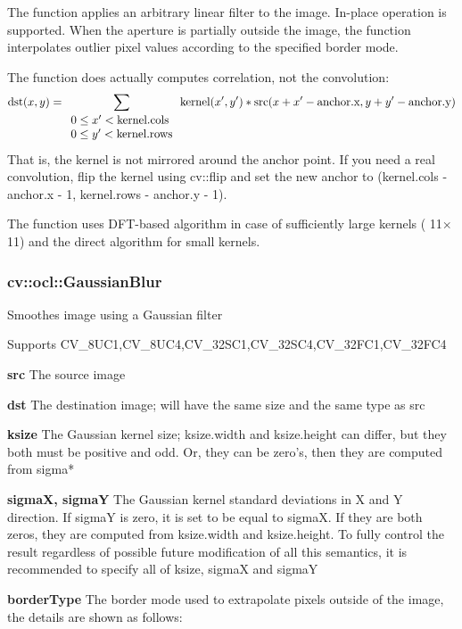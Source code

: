 \documentclass{article}
\begin{document}
The function applies an arbitrary linear filter to the image. In-place
operation is supported. When the aperture is partially outside the image,
the function interpolates outlier pixel values according to the specified
border mode.

The function does actually computes correlation, not the convolution:
\[
\mbox{dst}(x,y)=\sum\limits_{{\begin{array}{*{20}c}
 {0\le {x}'<\mbox{kernel.cols}} \hfill \\
 {0\le {y}'<\mbox{kernel.rows}} \hfill \\
\end{array} }} {\mbox{kernel}({x}',{y}')\ast
\mbox{src}(x+{x}'-\mbox{anchor.x},y+{y}'-\mbox{anchor.y})}
\]
That is, the kernel is not mirrored around the anchor point. If you need a
real convolution, flip the kernel using cv::flip and set the new anchor to
(kernel.cols - anchor.x - 1, kernel.rows - anchor.y - 1).

The function uses DFT-based algorithm in case of sufficiently large kernels
( 11$\times $11) and the direct algorithm for small kernels.

\newpage

\subsubsection{cv::ocl::GaussianBlur}
\label{subsubsec:mylabel38}
Smoothes image using a Gaussian filter

Supports CV{\_}8UC1,CV{\_}8UC4,CV{\_}32SC1,CV{\_}32SC4,CV{\_}32FC1,CV{\_}32FC4

\textbf{src }The source image

\textbf{dst }The destination image; will have the same size and the same
type as src

\textbf{ksize }The Gaussian kernel size; ksize.width and ksize.height can
differ, but they both must be positive and odd. Or, they can be zero's, then
they are computed from sigma*

\textbf{sigmaX, sigmaY }The Gaussian kernel standard deviations in X and Y
direction. If sigmaY is zero, it is set to be equal to sigmaX. If they are
both zeros, they are computed from ksize.width and ksize.height. To fully
control the result regardless of possible future modification of all this
semantics, it is recommended to specify all of ksize, sigmaX and sigmaY

\textbf{borderType }The border mode used to extrapolate pixels outside of
the image, the details are shown as follows:
\end{document}
